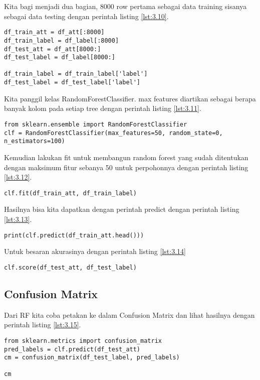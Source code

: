 Kita bagi menjadi dua bagian, 8000 row pertama sebagai data training sisanya sebagai data testing dengan perintah listing \ref{lst:3.10}.
\begin{lstlisting}[caption=Fungsi Sederhana,label={lst:3.10}]
df_train_att = df_att[:8000]
df_train_label = df_label[:8000]
df_test_att = df_att[8000:]
df_test_label = df_label[8000:]

df_train_label = df_train_label['label']
df_test_label = df_test_label['label']
\end{lstlisting}

Kita panggil kelas RandomForestClassifier. max features diartikan sebagai berapa banyak kolom pada setiap tree dengan perintah listing \ref{lst:3.11}.
\begin{lstlisting}[caption=Fungsi Sederhana,label={lst:3.11}]
from sklearn.ensemble import RandomForestClassifier
clf = RandomForestClassifier(max_features=50, random_state=0, n_estimators=100)

\end{lstlisting}
Kemudian lakukan fit untuk membangun random forest yang sudah ditentukan dengan maksimum fitur sebanya 50 untuk perpohonnya dengan perintah listing \ref{lst:3.12}.

\begin{lstlisting}[caption=Fungsi Sederhana,label={lst:3.12}]
clf.fit(df_train_att, df_train_label)
\end{lstlisting}
Hasilnya bisa kita dapatkan dengan perintah predict dengan perintah listing \ref{lst:3.13}.
\begin{lstlisting}[caption=Fungsi Sederhana,label={lst:3.13}]
print(clf.predict(df_train_att.head()))
\end{lstlisting}

Untuk besaran akurasinya dengan perintah listing \ref{lst:3.14}
\begin{lstlisting}[caption=Fungsi Sederhana,label={lst:3.14}]
clf.score(df_test_att, df_test_label)
\end{lstlisting}

\subsection{Confusion Matrix}
Dari RF kita coba petakan ke dalam Confusion Matrix dan lihat hasilnya dengan perintah listing \ref{lst:3.15}.
\begin{lstlisting}[caption=Fungsi Sederhana,label={lst:3.15}]
from sklearn.metrics import confusion_matrix
pred_labels = clf.predict(df_test_att)
cm = confusion_matrix(df_test_label, pred_labels)

cm
\end{lstlisting}

